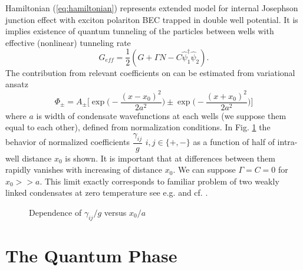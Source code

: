 \documentclass[aps, pre, preprint, groupedaddress, superscriptaddress, showkeys, showpacs] {revtex4-1}
\begin{document}
Hamiltonian (\ref{eq:hamiltonian}) represents extended model for internal Josephson junction effect with exciton polariton BEC trapped in double well potential.
It is implies existence of quantum tunneling of the particles between wells with effective (nonlinear) tunneling rate
%
\begin{equation}
G_{eff} = \dfrac{1}{2}(G+\Gamma N - C\hat{\psi}_1^\dag\hat{\psi}_2).
\label{eq:tunneling_rate}
\end{equation}
%
The contribution from relevant coefficients on can be estimated from variational ansatz
%
\begin{equation}
\Phi_{\pm} = A_{\pm} \Big[ \exp \Big( -\dfrac{(x - x_0)^2}{2 a^2} \Big) \pm \exp \Big( -\dfrac{(x + x_0)^2}{2 a^2} \Big) \Big]
\label{eq:two_modes_eq}
\end{equation}
%
where $a$ is width of condensate wavefunctions at each wells (we suppose them equal to each other), defined from normalization conditions.
In Fig. \ref{pic:gamma_pm_vs_g} the behavior of normalized coefficients $\dfrac{\gamma_{ij}}{g}$ $i,j \in \{+,-\}$ as a function of half of intra-well distance $x_0$ is shown.
It is important that at differences between them rapidly vanishes with increasing of distance $x_0$.
We can suppose $\Gamma = C = 0$ for $x_0 >> a$.
This limit exactly corresponds to familiar problem of two weakly linked condensates at zero temperature {\red see e.g. \cite{Raghavan} and cf. }.
%
\begin{figure}[ht]
\caption{Dependence of $\gamma_{ij} / g$ versus $x_0 / a$ \label{pic:gamma_pm_vs_g}}
\end{figure}
%

\section{The Quantum Phase \label{sec:quantum_phase}}
\end{document}
